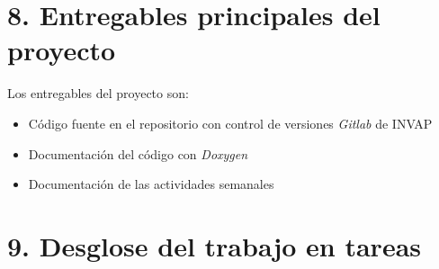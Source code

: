 \documentclass[
11pt, %
]{charter}
\begin{document}
\section{8. Entregables principales del proyecto}
\label{sec:entregables}

Los entregables del proyecto son:

\begin{itemize}
	\item Código fuente en el repositorio con control de versiones \emph{Gitlab} de INVAP
	\item Documentación del código con \emph{Doxygen}
	\item Documentación de las actividades semanales
\end{itemize}


\section{9. Desglose del trabajo en tareas}
\label{sec:wbs}
\end{document}
